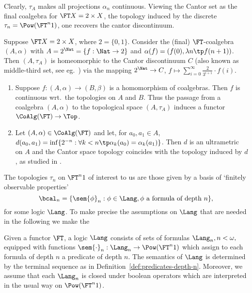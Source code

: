 \documentclass{entcs}
\begin{document}
Clearly, $\tau_A$ makes all projections $\alpha_n$ continuous.
Viewing the Cantor set as the final coalgebra for $\FT X = 2 \times X$, the
topology induced by the discrete $\tau_n = \Pow(\FT^n 1)$, one recovers the
cantor discontinuum.
%
\begin{example} \label{example:mittel-drittel}
  Suppose $\FT X = 2 \times X$, where $2 = \lbrace 0, 1 \rbrace$.
  Consider the (final) $\FT$-coalgebra $(A, \alpha)$ with $A =
  2^{\Nat} = \lbrace f : \Nat \to 2 \rbrace$
  and $\alpha(f) = (f(0), \lambda n\tp f(n+1))$. Then $(A, \tau_A)$ is
  homeomorphic to the Cantor discontinuum $C$ (also known as
  middle-third set, see eg.\ \cite{kelley:gt}) via the mapping
  $2^{\Nat} \to C$, $f \mapsto \sum_{i = 0}^{\infty}
  \frac{2}{3^{i+1}} \cdot f(i)$.
\end{example}


\begin{remark} \label{remark:metric-space}
\begin{enumerate}
\item Suppose $f: (A, \alpha) \to (B, \beta)$ is a homomorphism of coalgebras.
  Then $f$ is continuous wrt.\ the topologies on $A$ and $B$. Thus the passage
  from a coalgebra $(A, \alpha)$ to the topological space $(A, \tau_A)$
  induces a functor $\CoAlg(\FT) \to \Top$.
\item %
  Let $(A, \alpha) \in \CoAlg(\FT)$ and let, for $a_0,a_1\in A$,
  $d(a_0, a_1) = \inf \lbrace 2^{-n} : \forall k < n \tp \alpha_k(a_0)
  = \alpha_k(a_1) \rbrace$. Then $d$ is an ultrametric on $A$ and the
  Cantor space topology
  coincides with the topology induced by $d$, as studied in
  \cite{barr:tc,worrell:diss}.
\end{enumerate}
\end{remark}


The topologies $\tau_n$ on $\FT^n 1$ of interest to us are those given
by a basis of `finitely observable properties'
%
$$\bcal_n=\{\sem{\phi}_n: \phi\in\Lang, \phi\text{ a formula of depth
  $n$}\},$$
%
for some logic $\Lang$. To make precise the assumptions on $\Lang$
that are needed in the following we make the
%
\begin{conv}\label{convention}
  Given a functor $\FT$, a logic $\Lang$ consists of sets of formulas
  $\Lang_n, n<\omega,$ equipped with functions
  $\sem{\cdot}_n:\Lang_n\to\Pow(\FT^n 1)$ which assign to each formula
  of depth $n$ a predicate of depth $n$. The semantics of $\Lang$ is
  determined by the terminal sequence as in
  Definition~\ref{def:predicates-depth-n}. Moreover, we assume that
  each $\Lang_n$ is closed under boolean operators which are
  interpreted in the usual way on $\Pow(\FT^n 1)$.
\end{conv}
\end{document}
